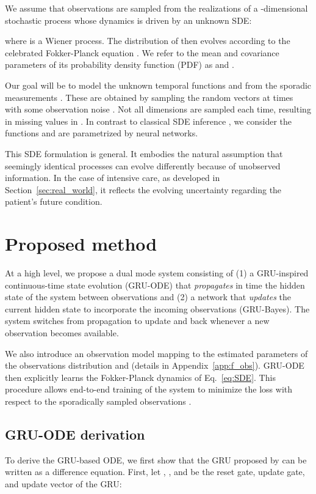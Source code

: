 \documentclass{article}
\begin{document}
We assume that observations  are sampled from the realizations of a -dimensional stochastic process  whose dynamics is driven by an unknown SDE: 

where  is a Wiener process. The distribution of  then evolves according to the celebrated Fokker-Planck equation \citep{risken1996fokker}. We refer to the mean and covariance parameters of its probability density function (PDF) as  and . 

Our goal will be to model the unknown temporal functions   and  from the sporadic measurements . These are obtained by sampling the random vectors  at times  with some observation noise . Not all dimensions are sampled each time, resulting in missing values in . In contrast to classical SDE inference \citep{sarkka2019applied}, we consider the functions  and  are parametrized by neural networks.

This SDE formulation is general. It embodies the natural assumption that seemingly identical processes can evolve differently because of unobserved information. In the case of intensive care, as developed in Section~\ref{sec:real_world}, it reflects the evolving uncertainty regarding the patient's future condition. 



\section{Proposed method}
At a high level, we propose a dual mode system consisting of (1) a GRU-inspired continuous-time state evolution (GRU-ODE) that \emph{propagates} in time the hidden state  of the system between observations and (2) a network that \emph{updates} the current hidden state to incorporate the incoming observations (GRU-Bayes). The system switches from propagation to update and back whenever a new observation becomes available.

We also introduce an observation model  mapping  to the estimated parameters of the observations distribution   and  (details in Appendix~\ref{app:f_obs}). GRU-ODE then explicitly learns the Fokker-Planck dynamics of Eq.~\ref{eq:SDE}. This procedure allows end-to-end training of the system to minimize the loss with respect to the sporadically sampled observations .

\subsection{GRU-ODE derivation}
\label{sec:gru-ode}
To derive the GRU-based ODE, we first show that the GRU proposed by \citet{cho14:gru} can be written as a difference equation. First, let  , , and   be the reset gate, update gate, and update vector of the GRU: 
\end{document}
